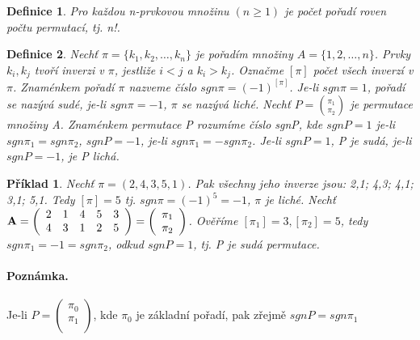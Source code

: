 \documentclass[12pt,a4paper]{article}
\newtheorem{definition}{Definice}
\newtheorem{example}{Příklad}
\begin{document}
\begin{definition}
	Pro každou n-prvkovou množinu $(n \geq 1)$ je počet pořadí roven počtu permutací, tj. n!.
\end{definition}


\begin{definition}
	Nechť $\pi = \{k_1,k_2, \dots, k_n\}$ je pořadím množiny $A = \{ 1,2,\dots, n\}$. Prvky $k_i,k_j$ tvoří inverzi v $\pi$, jestliže $i < j$ a  $k_i > k_j$. Označme $[\pi]$ počet všech inverzí v $\pi$. Znaménkem pořadí $\pi$ nazveme číslo $sgn\pi = (-1)^{[\pi]}$. Je-li $sgn\pi = 1$, pořadí se nazývá sudé, je-li $sgn\pi = -1$,  $\pi$ se nazývá liché. Nechť $P = { \pi_1 \choose \pi_2}$ je permutace množiny A. Znaménkem permutace P rozumíme číslo sgnP, kde $sgnP = 1$ je-li $sgn\pi_1 = sgn\pi_2$, $sgnP = -1$, je-li $sgn\pi_1 = - sgn\pi_2$. Je-li $sgnP = 1$, P je sudá, je-li $sgnP = -1$, je P lichá.
\end{definition}

\begin{example}
	Nechť $\pi = (2,4,3,5,1)$. Pak všechny jeho inverze jsou: 2,1; 4,3; 4,1; 3,1; 5,1. Tedy $[\pi] = 5$ tj. $sgn\pi = (-1)^5 = -1$, $\pi$ je liché.
	Nechť ${\bf A} =
\left( \begin{array}{ccccc}
2 & 1 & 4 & 5 & 3 \\
4 & 3 & 1 & 2 & 5 \\
\end{array} \right) = \left( \begin{array}{c}
\pi_1 \\
\pi_2 \\
\end{array} \right) $. Ověříme $[\pi_1] = 3, [\pi_2] = 5$, tedy $sgn\pi_1 = -1 = sgn\pi_2$, odkud $sgnP = 1$, tj. P je sudá permutace.
\end{example}

\paragraph{Poznámka.} Je-li $P = \left( \begin{array}{c} \pi_0 \\ \pi_1 \\ \end{array} \right)$, kde $\pi_0$ je základní pořadí, pak zřejmě $sgnP = sgn\pi_1$
\end{document}
